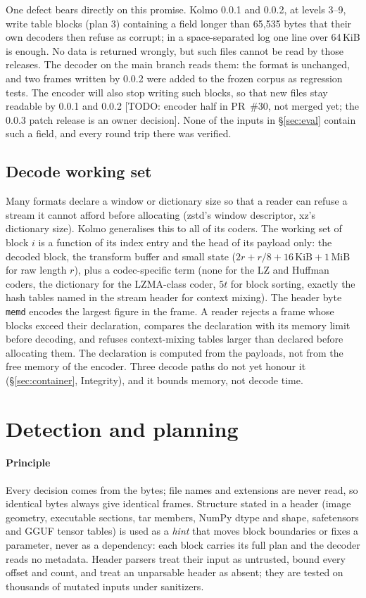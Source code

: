 \documentclass[conference]{IEEEtran}
\newcommand{\todoin}[1]{{\color{red}\footnotesize[TODO: #1]}}
\newcommand{\todoin}[1]{}
\begin{document}
One defect bears directly on this promise. Kolmo 0.0.1 and 0.0.2, at levels 3--9, write table blocks (plan 3)
containing a field longer than 65,535 bytes that their own decoders then refuse as corrupt; in a space-separated log
one line over 64\,KiB is enough. No data is returned wrongly, but such files cannot be read by those releases. The
decoder on the main branch reads them: the format is unchanged, and two frames written by 0.0.2 were added to the
frozen corpus as regression tests. The encoder will also stop writing such blocks, so that new files stay readable
by 0.0.1 and 0.0.2 \todoin{encoder half in PR~\#30, not merged yet; the 0.0.3 patch release is an owner decision}. None of the inputs in \S\ref{sec:eval} contain such a field, and every round trip there was
verified.

\subsection{Decode working set}\label{sec:memd}
Many formats declare a window or dictionary size so that a reader can refuse a stream it cannot afford before
allocating (zstd's window descriptor, xz's dictionary size). Kolmo generalises this to all of its coders. The
working set of block $i$ is a function of its index entry and the head of its payload only: the decoded block,
the transform buffer and small state ($2r + r/8 + 16\,\text{KiB} + 1\,\text{MiB}$ for raw length $r$), plus a
codec-specific term (none for the LZ and Huffman coders, the dictionary for the LZMA-class coder, $5t$ for block
sorting, exactly the hash tables named in the stream header for context mixing). The header byte \texttt{memd}
encodes the largest figure in the frame. A reader rejects a frame whose blocks exceed their declaration, compares
the declaration with its memory limit before decoding, and refuses context-mixing tables larger than declared before
allocating them. The declaration is computed from the payloads, not from the free memory of the encoder. Three
decode paths do not yet honour it (\S\ref{sec:container}, Integrity), and it bounds memory, not decode time.

\section{Detection and planning}\label{sec:detect}

\paragraph*{Principle} Every decision comes from the bytes; file names and extensions are never read, so identical
bytes always give identical frames. Structure stated in a header (image geometry, executable sections, tar members,
NumPy dtype and shape, safetensors and GGUF tensor tables) is used as a \emph{hint} that moves block boundaries or
fixes a parameter, never as a dependency: each block carries its full plan and the decoder reads no metadata. Header
parsers treat their input as untrusted, bound every offset and count, and treat an unparsable header as absent; they
are tested on thousands of mutated inputs under sanitizers.
\end{document}
